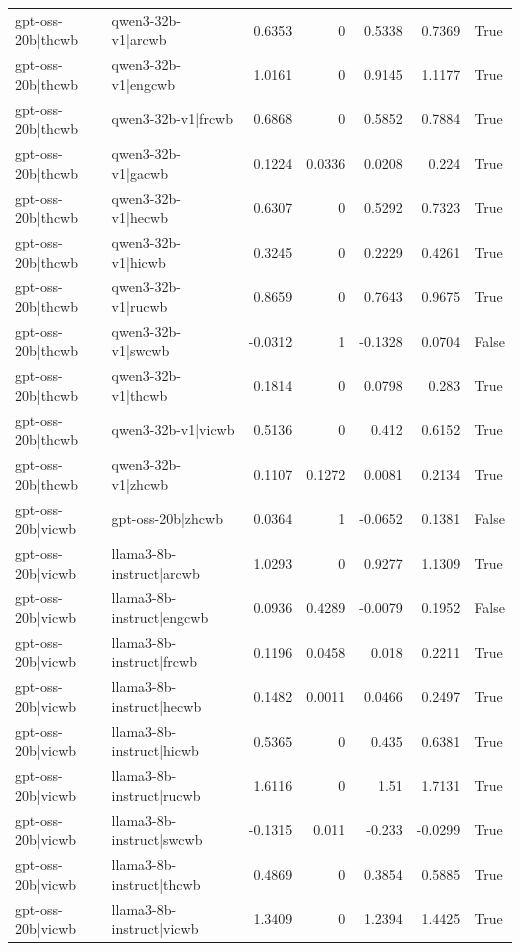 \begin{table}
\begin{tabular}{l l r r r r l}
gpt-oss-20b|thcwb & qwen3-32b-v1|arcwb & 0.6353 & 0 & 0.5338 & 0.7369 & True \\
gpt-oss-20b|thcwb & qwen3-32b-v1|engcwb & 1.0161 & 0 & 0.9145 & 1.1177 & True \\
gpt-oss-20b|thcwb & qwen3-32b-v1|frcwb & 0.6868 & 0 & 0.5852 & 0.7884 & True \\
gpt-oss-20b|thcwb & qwen3-32b-v1|gacwb & 0.1224 & 0.0336 & 0.0208 & 0.224 & True \\
gpt-oss-20b|thcwb & qwen3-32b-v1|hecwb & 0.6307 & 0 & 0.5292 & 0.7323 & True \\
gpt-oss-20b|thcwb & qwen3-32b-v1|hicwb & 0.3245 & 0 & 0.2229 & 0.4261 & True \\
gpt-oss-20b|thcwb & qwen3-32b-v1|rucwb & 0.8659 & 0 & 0.7643 & 0.9675 & True \\
gpt-oss-20b|thcwb & qwen3-32b-v1|swcwb & -0.0312 & 1 & -0.1328 & 0.0704 & False \\
gpt-oss-20b|thcwb & qwen3-32b-v1|thcwb & 0.1814 & 0 & 0.0798 & 0.283 & True \\
gpt-oss-20b|thcwb & qwen3-32b-v1|vicwb & 0.5136 & 0 & 0.412 & 0.6152 & True \\
gpt-oss-20b|thcwb & qwen3-32b-v1|zhcwb & 0.1107 & 0.1272 & 0.0081 & 0.2134 & True \\
gpt-oss-20b|vicwb & gpt-oss-20b|zhcwb & 0.0364 & 1 & -0.0652 & 0.1381 & False \\
gpt-oss-20b|vicwb & llama3-8b-instruct|arcwb & 1.0293 & 0 & 0.9277 & 1.1309 & True \\
gpt-oss-20b|vicwb & llama3-8b-instruct|engcwb & 0.0936 & 0.4289 & -0.0079 & 0.1952 & False \\
gpt-oss-20b|vicwb & llama3-8b-instruct|frcwb & 0.1196 & 0.0458 & 0.018 & 0.2211 & True \\
gpt-oss-20b|vicwb & llama3-8b-instruct|hecwb & 0.1482 & 0.0011 & 0.0466 & 0.2497 & True \\
gpt-oss-20b|vicwb & llama3-8b-instruct|hicwb & 0.5365 & 0 & 0.435 & 0.6381 & True \\
gpt-oss-20b|vicwb & llama3-8b-instruct|rucwb & 1.6116 & 0 & 1.51 & 1.7131 & True \\
gpt-oss-20b|vicwb & llama3-8b-instruct|swcwb & -0.1315 & 0.011 & -0.233 & -0.0299 & True \\
gpt-oss-20b|vicwb & llama3-8b-instruct|thcwb & 0.4869 & 0 & 0.3854 & 0.5885 & True \\
gpt-oss-20b|vicwb & llama3-8b-instruct|vicwb & 1.3409 & 0 & 1.2394 & 1.4425 & True \\

\end{tabular}
\end{table}
